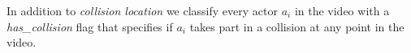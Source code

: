 \documentclass[letterpaper, 10 pt, conference]{ieeeconf}
\begin{document}
In addition to \textit{collision location} we classify every actor $a_i$ in the video with a \textit{has\_collision} flag that specifies if $a_i$ takes part in a collision at any point in the video.





\end{document}
